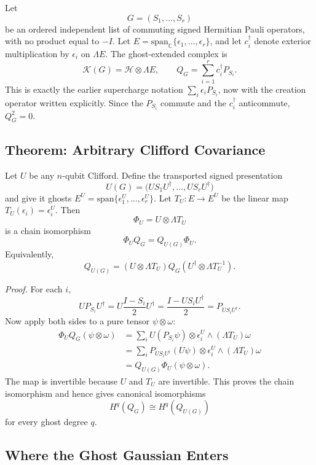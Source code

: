 Let
\[
  G=(S_1,\ldots,S_r)
\]
be an ordered independent list of commuting signed Hermitian Pauli operators,
with no product equal to \(-I\).  Let \(E=\mathrm{span}_{\mathbb C}
\{\epsilon_1,\ldots,\epsilon_r\}\), and let \(c_i^\dagger\) denote exterior
multiplication by \(\epsilon_i\) on \(\Lambda E\).  The ghost-extended complex
is
\[
  \mathcal K(G)=\mathcal H\otimes\Lambda E,
  \qquad
  Q_G=\sum_{i=1}^r c_i^\dagger P_{S_i}.
\]
This is exactly the earlier supercharge notation
\(\sum_i\epsilon_iP_{S_i}\), now with the creation operator written
explicitly.  Since the \(P_{S_i}\) commute and the \(c_i^\dagger\) anticommute,
\(Q_G^2=0\).

\subsection{Theorem: Arbitrary Clifford Covariance}

Let \(U\) be any \(n\)-qubit Clifford.  Define the transported signed
presentation
\[
  U(G)=\bigl(US_1U^\dagger,\ldots,US_rU^\dagger\bigr)
\]
and give it ghosts \(E^U=\mathrm{span}\{\epsilon_1^U,\ldots,\epsilon_r^U\}\).
Let \(T_U:E\to E^U\) be the linear map \(T_U(\epsilon_i)=\epsilon_i^U\).  Then
\[
  \Phi_U=U\otimes\Lambda T_U
\]
is a chain isomorphism
\[
  \Phi_U Q_G=Q_{U(G)}\Phi_U .
\]
Equivalently,
\[
  Q_{U(G)}
  =
  (U\otimes\Lambda T_U)Q_G(U^\dagger\otimes\Lambda T_U^{-1}).
\]

\emph{Proof.}
For each \(i\),
\[
  U P_{S_i} U^\dagger
  =
  U\frac{I-S_i}{2}U^\dagger
  =
  \frac{I-US_iU^\dagger}{2}
  =
  P_{US_iU^\dagger}.
\]
Now apply both sides to a pure tensor \(\psi\otimes\omega\):
\[
\begin{aligned}
  \Phi_UQ_G(\psi\otimes\omega)
  &=
  \sum_i U(P_{S_i}\psi)\otimes
        \epsilon_i^U\wedge(\Lambda T_U)\omega                 \\
  &=
  \sum_i P_{US_iU^\dagger}(U\psi)\otimes
        \epsilon_i^U\wedge(\Lambda T_U)\omega                 \\
  &=
  Q_{U(G)}\Phi_U(\psi\otimes\omega).
\end{aligned}
\]
The map is invertible because \(U\) and \(T_U\) are invertible.  This proves
the chain isomorphism and hence gives canonical isomorphisms
\[
  H^q(Q_G)\cong H^q(Q_{U(G)})
\]
for every ghost degree \(q\).

\subsection{Where the Ghost Gaussian Enters}

